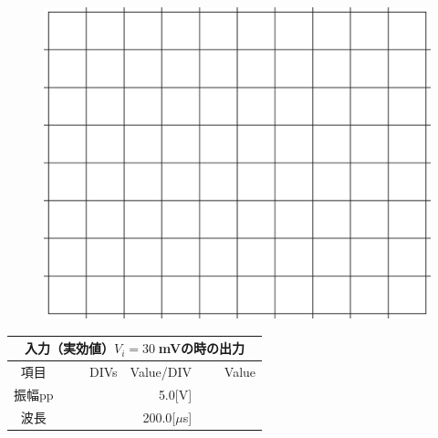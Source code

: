 \documentclass[uplatex,a4paper,11pt,oneside,openany]{jsbook}
\begin{document}
\begin{multicols}{2}
  \begin{figure}[H]
     \centering
      \includegraphics[keepaspectratio, scale=0.28, angle=0]
                  {figs/eps/grid.eps}
                  \label{fig:grid30mV}
  \end{figure}

  \begin{spacing}{1.5}
  \begin{tabular}{|c||r|r|r|}
    \multicolumn{4}{c}{入力（実効値）$V_i=30\;$mVの時の出力} \\ \hline
    項目 & DIVs & Value/DIV & Value \\ \hline \hline
    振幅pp & 　　　　 & 5.0[V]& 　　　　 \\ \hline
    波長 & 　　　　 & 200.0[$\mu$s]& 　　　　 \\ \hline
  \end{tabular}
\end{spacing}
\end{multicols}

\vfill
\end{document}
